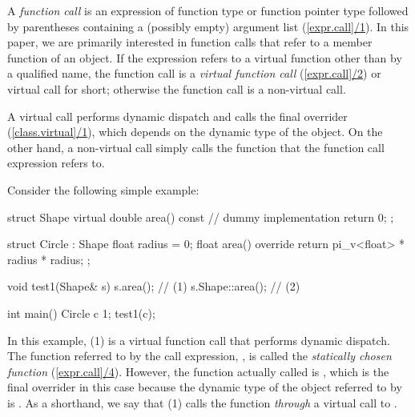 
A \emph{function call} is an expression of function type or function pointer type followed by parentheses containing a (possibly empty) argument list (\href{https://eel.is/c++draft/expr.call#1}{[expr.call]/1}). In this paper, we are primarily interested in function calls that refer to a member function of an object. If the expression refers to a virtual function other than by a qualified name, the function call is a \emph{virtual function call} (\href{https://eel.is/c++draft/expr.call#2}{[expr.call]/2}) or virtual call for short; otherwise the function call is a non-virtual call.

A virtual call performs dynamic dispatch and calls the final overrider (\href{https://eel.is/c++draft/expr.call#2.sentence-2}{[class.virtual]/1}), which depends on the dynamic type of the object. On the other hand, a non-virtual call simply calls the function that the function call expression refers to. 

Consider the following simple example:

\begin{codeblock}
struct Shape {
  virtual double area() const { 
    // dummy implementation
    return 0; 
  }
};

struct Circle : Shape {
  float radius = 0;
  float area() override { 
    return pi_v<float> * radius * radius; 
  }
};

void test1(Shape& s) {
  s.area();        // (1)
  s.Shape::area(); // (2)
}

int main() {
  Circle c {1};
  test1(c);
}
\end{codeblock}

In this example, (1) is a virtual function call that performs dynamic dispatch. The function referred to by the call expression, , is called the \emph{statically chosen function} (\href{https://eel.is/c++draft/expr.call#4.sentence-1}{[expr.call]/4}). However, the function actually called is , which is the final overrider in this case because the dynamic type of the object referred to by  is . As a shorthand, we say that (1) calls the function  \emph{through} a virtual call to .

